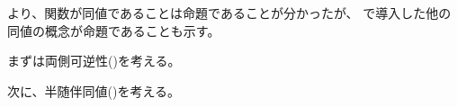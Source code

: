 \documentclass[index]{subfiles}
\begin{document}

より、関数が同値であることは命題であることが分かったが、
で導入した他の同値の概念が命題であることも示す。

まずは両側可逆性()を考える。





次に、半随伴同値()を考える。



\end{document}

